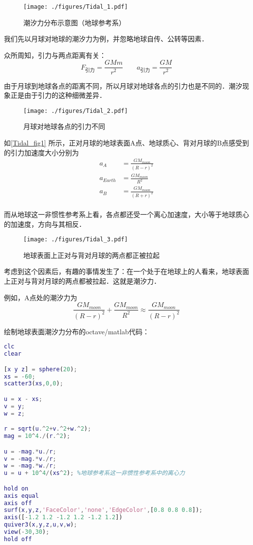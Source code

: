 
\begin{issues}
\issueDraft
\end{issues}
\begin{figure}[ht]
\centering
\texttt{[image: ./figures/Tidal\_1.pdf]}
\caption{潮汐力分布示意图（地球参考系）} \label{Tidal_fig1}
\end{figure}

我们先以月球对地球的潮汐力为例，并忽略地球自传、公转等因素．

众所周知，引力与两点距离有关：
$$F_\text{引力}=\frac{GMm}{r^2} \qquad a_\text{引力}=\frac{GM}{r^2}$$

由于月球到地球各点的距离不同，所以月球对地球各点的引力也是不同的．潮汐现象正是由于引力的这种细微差异．

\begin{figure}[ht]
\centering
\texttt{[image: ./figures/Tidal\_2.pdf]}
\caption{月球对地球各点的引力不同} \label{Tidal_fig2}
\end{figure}
如\autoref{Tidal_fig1} 所示，正对月球的地球表面A点、地球质心、背对月球的B点感受到的引力加速度大小分别为
\begin{equation}
\begin{aligned}
a_A &= \frac{GM_{moon}}{(R-r)^2}\\
a_{Earth} &= \frac{GM_{moon}}{R^2}\\
a_B &= \frac{GM_{moon}}{(R+r)^2}\\
\end{aligned}
\end{equation}

而从地球这一非惯性参考系上看，各点都还受一个离心加速度，大小等于地球质心的加速度，方向与其相反．
\begin{figure}[ht]
\centering
\texttt{[image: ./figures/Tidal\_3.pdf]}
\caption{地球表面上正对与背对月球的两点都正被拉起} \label{Tidal_fig3}
\end{figure}
考虑到这个因素后，有趣的事情发生了：在一个处于在地球上的人看来，地球表面上正对与背对月球的两点都被拉起．这就是潮汐力．

例如，A点处的潮汐力为
$$
\frac{GM_{moon}}{(R-r)^2} + \frac{GM_{moon}}{R^2}
\approx \frac{GM_{moon}}{(R-r)^2} 
$$


绘制地球表面潮汐力分布的octave/matlab代码：
\begin{lstlisting}[language=matlab]
clc
clear

[x y z] = sphere(20);
xs = -60;
scatter3(xs,0,0);

u = x - xs;
v = y;
w = z;

r = sqrt(u.^2+v.^2+w.^2);
mag = 10^4./(r.^2);

u = -mag.*u./r;
v = -mag.*v./r;
w = -mag.*w./r;
u = u + 10^4/(xs^2); %地球参考系这一非惯性参考系中的离心力

hold on
axis equal
axis off
surf(x,y,z,'FaceColor','none','EdgeColor',[0.8 0.8 0.8]);
axis([-1.2 1.2 -1.2 1.2 -1.2 1.2])
quiver3(x,y,z,u,v,w);
view(-30,30);
hold off

\end{lstlisting}